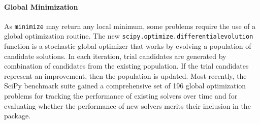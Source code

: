 \documentclass[fleqn,10pt]{wlscirep}
\begin{document}
\paragraph{Global Minimization}
As \texttt{minimize} may return any local minimum, some problems require the use of a global optimization routine. The new \texttt{scipy.optimize.differential\textunderscore evolution} function \cite{Wormington1999,Storn1997} is a stochastic global optimizer that works by evolving a population of candidate solutions. In each iteration, trial candidates are generated by combination of candidates from the existing population. If the trial candidates represent an improvement, then the population is updated. Most recently, the SciPy benchmark suite gained a comprehensive set of 196 global optimization problems for tracking the performance of existing solvers over time and for evaluating whether the performance of new solvers merits their inclusion in the package.
\end{document}
